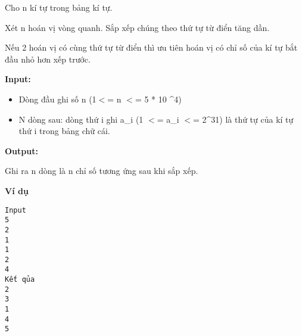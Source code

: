 

Cho n kí tự trong bảng kí tự.

Xét n hoán vị vòng quanh. Sắp xếp chúng theo thứ tự từ điển tăng dần.

Nếu 2 hoán vị có cùng thứ tự từ điển thì ưu tiên hoán vị có chỉ số của kí tự bắt đầu nhỏ hơn xếp trước.

\textbf{Input:}
\begin{itemize}
	\item Dòng đầu ghi số n (1$<$= n $<$= 5 * 10 \textasciicircum 4)
	\item N dòng sau: dòng thứ i ghi a\_i (1 $<$= a\_i $<$= 2\textasciicircum31) là thứ tự của kí tự thứ i trong bảng chữ cái.
\end{itemize}

\textbf{Output:}

Ghi ra n dòng là n chỉ số tương ứng sau khi sắp xếp.

\textbf{Ví dụ}
\begin{verbatim}
Input
5
2
1
1
2
4
Kết qủa
2
3
1
4
5\end{verbatim}